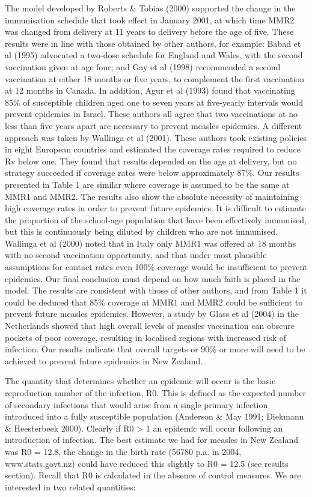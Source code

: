 \documentclass{article}
\begin{document}
The model developed by Roberts & Tobias (2000) supported the change in the
immunisation schedule that took effect in January 2001, at which time MMR2
was changed from delivery at 11 years to delivery before the age of five. These
results were in line with those obtained by other authors, for example: Babad
et al (1995) advocated a two-dose schedule for England and Wales, with the
second vaccination given at age four; and Gay et al (1998) recommended a
second vaccination at either 18 months or five years, to complement the first
vaccination at 12 months in Canada. In addition, Agur et al (1993) found that
vaccinating 85\% of susceptible children aged one to seven years at five-yearly
intervals would prevent epidemics in Israel. These authors all agree that two
vaccinations at no less than five years apart are necessary to prevent measles
epidemics.
A different approach was taken by Wallinga et al (2001). These authors took
existing policies in eight European countries and estimated the coverage rates
required to reduce Rv below one. They found that results depended on the
age at delivery, but no strategy succeeded if coverage rates were below approximately
87\%. Our results presented in Table 1 are similar where coverage is
assumed to be the same at MMR1 and MMR2. The results also show the absolute
necessity of maintaining high coverage rates in order to prevent future
epidemics. It is difficult to estimate the proportion of the school-age population
that have been effectively immunised, but this is continuously being
diluted by children who are not immunised. Wallinga et al (2000) noted that
in Italy only MMR1 was offered at 18 months with no second vaccination opportunity,
and that under most plausible assumptions for contact rates even
100\% coverage would be insufficient to prevent epidemics.
Our final conclusion must depend on how much faith is placed in the model.
The results are consistent with those of other authors, and from Table 1 it
could be deduced that 85\% coverage at MMR1 and MMR2 could be sufficient
to prevent future measles epidemics. However, a study by Glass et al (2004)
in the Netherlands showed that high overall levels of measles vaccination can
obscure pockets of poor coverage, resulting in localised regions with increased
risk of infection. Our results indicate that overall targets or 90\% or more will
need to be achieved to prevent future epidemics in New Zealand.

The quantity that determines whether an epidemic will occur is the basic
reproduction number of the infection, R0. This is defined as the expected
number of secondary infections that would arise from a single primary infection
introduced into a fully susceptible population (Anderson & May 1991;
Diekmann & Heesterbeek 2000). Clearly if R0 > 1 an epidemic will occur following
an introduction of infection. The best estimate we had for measles in
New Zealand was R0 = 12.8, the change in the birth rate (56780 p.a. in 2004,
www.stats.govt.nz) could have reduced this slightly to R0 = 12.5 (see results
section). Recall that R0 is calculated in the absence of control measures. We
are interested in two related quantities:
\end{document}
